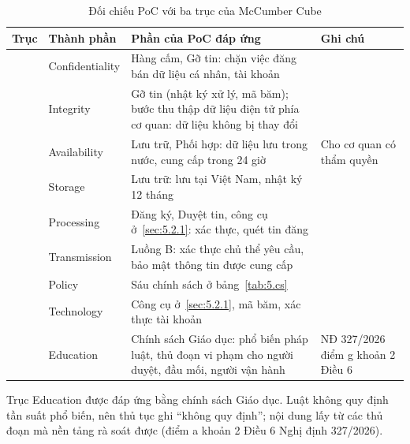 {\small{}
\begin{table}[H]
\centering
\caption{Đối chiếu PoC với ba trục của McCumber Cube}\label{tab:5.mc}
\begin{tabularx}{\textwidth}{>{\raggedright\arraybackslash}l>{\raggedright\arraybackslash}l>{\hsize=1.3\hsize\raggedright\arraybackslash}X>{\hsize=0.7\hsize\raggedright\arraybackslash}X}
\toprule
\textbf{Trục} & \textbf{Thành phần} & \textbf{Phần của PoC đáp ứng} & \textbf{Ghi chú} \\
\midrule
\multirow{3}{*}{CIA} & Confidentiality & Hàng cấm, Gỡ tin: chặn việc đăng bán dữ liệu cá nhân, tài khoản & \\
 & Integrity & Gỡ tin (nhật ký xử lý, mã băm); bước thu thập dữ liệu điện tử phía cơ quan: dữ liệu không bị thay đổi & \\
 & Availability & Lưu trữ, Phối hợp: dữ liệu lưu trong nước, cung cấp trong 24 giờ & Cho cơ quan có thẩm quyền \\
\midrule
\multirow{3}{*}{Trạng thái} & Storage & Lưu trữ: lưu tại Việt Nam, nhật ký 12 tháng & \\
 & Processing & Đăng ký, Duyệt tin, công cụ ở~\ref{sec:5.2.1}: xác thực, quét tin đăng & \\
 & Transmission & Luồng B: xác thực chủ thể yêu cầu, bảo mật thông tin được cung cấp & \\
\midrule
\multirow{3}{*}{Biện pháp} & Policy & Sáu chính sách ở bảng~\ref{tab:5.cs} & \\
 & Technology & Công cụ ở~\ref{sec:5.2.1}, mã băm, xác thực tài khoản & \\
 & Education & Chính sách Giáo dục: phổ biến pháp luật, thủ đoạn vi phạm cho người duyệt, đầu mối, người vận hành & NĐ 327/2026 điểm g khoản 2 Điều 6 \\
\bottomrule
\end{tabularx}
\end{table}}

Trục Education được đáp ứng bằng chính sách Giáo dục. Luật không quy định tần suất phổ biến, nên thủ tục ghi “không quy định”; nội dung lấy từ các thủ đoạn mà nền tảng rà soát được (điểm a khoản 2 Điều 6 Nghị định 327/2026).
